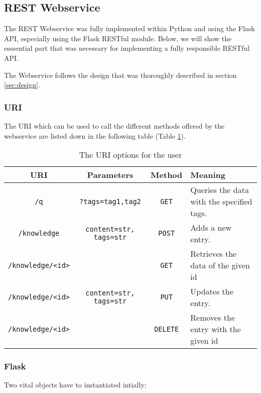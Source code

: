 \documentclass[11pt, a4paper]{article}
\begin{document}
\subsection{REST Webservice}

The REST Webservice was fully implemented within Python and using the Flask API,
especially using the Flask RESTful module. Below, we will show the esssential
part that was necessary for implementing a fully responsible RESTful API.  

The Webservice follows the design that was thoroughly described in section
\ref{sec:design}.

\subsubsection{URI}

The URI which can be used to call the different methods offered by the
webservice are listed down in the following table (Table \ref{tab:uri}).

\begin{table}[htbp]
  \centering
  \begin{tabular}{| c | c | c | l | } \hline
    \textbf{URI} & \textbf{Parameters} & \textbf{Method} & \textbf{Meaning} \\ \hline
    \lstinline|/q| & \lstinline|?tags=tag1,tag2| & \lstinline|GET| & Queries the data with the specified tags.  \\ \hline
    \lstinline|/knowledge| & \lstinline|content=str, tags=str| & \lstinline|POST| & Adds a new entry. \\ \hline
    \lstinline|/knowledge/<id>| &  & \lstinline|GET| & Retrieves the data of the given id  \\ \hline
    \lstinline|/knowledge/<id>| & \lstinline|content=str, tags=str| & \lstinline|PUT| & Updates the entry.   \\ \hline
    \lstinline|/knowledge/<id>| &  & \lstinline|DELETE| & Removes the entry with the given id \\ \hline
  \end{tabular}
  \caption{The URI options for the user}
  \label{tab:uri}
\end{table}

\subsubsection{Flask}

Two vital objects have to instantiated intially: 
\end{document}
